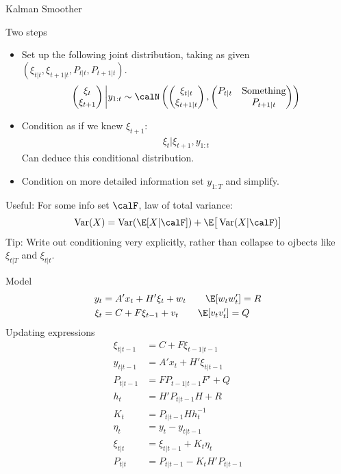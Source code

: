 \documentclass[handout]{beamer}
\newcommand{\Var}{\operatorname{Var}}
\begin{document}
\begin{frame}[shrink]{Kalman Smoother}

Two steps
\begin{itemize}
  \item Set up the following joint distribution, taking as given
    $(\xi_{t|t},\xi_{t+1|t},P_{t|t},P_{t+1|t})$.
    \begin{align*}
      \begin{pmatrix}
        \xi_{t} \\
        \xi_{t+1}
      \end{pmatrix}
      \bigg|
      y_{1:t}
      \sim
      \calN\left(
      \begin{pmatrix}
        \xi_{t|t}
        \\
        \xi_{t+1|t}
      \end{pmatrix}
      ,
      \begin{pmatrix}
        P_{t|t} & \text{Something}
        \\
        & P_{t+1|t}
      \end{pmatrix}
      \right)
    \end{align*}
  \item
    Condition as if we knew $\xi_{t+1}$:
    \begin{align*}
      \xi_{t} | \xi_{t+1},y_{1:t}
    \end{align*}
    Can deduce this conditional distribution.

  \item
    Condition on more detailed information set $y_{1:T}$ and simplify.

\end{itemize}
Useful: For some info set $\calF$, law of total variance:
\begin{align*}
  \Var(X)
  =
  \Var(\E[X|\calF])
  +
  \E\big[\Var(X|\calF)\big]
\end{align*}
Tip: Write out conditioning very explicitly, rather than collapse to
ojbects like $\xi_{t|T}$ and $\xi_{t|t}$.
\end{frame}



\begin{frame}[shrink]
Model
\begin{align*}
  y_t &= A'x_t + H'\xi_t + w_t
  \qquad \E[w_tw_t'] = R \\
  \xi_t &= C + F\xi_{t-1} + v_t
  \qquad
  \E[v_tv_t']=Q
\end{align*}
Updating expressions
\begin{align*}
  \xi_{t|t-1}
  &=
  C + F \xi_{t-1|t-1}
  \\
  y_{t|t-1}
  &=
  A'x_t + H'\xi_{t|t-1}
  \\
  P_{t|t-1}
  &=
  FP_{t-1|t-1}F'
  + Q
  \\
  h_t
  &=
  H'P_{t|t-1}H
  + R
  \\
  K_t
  &=
  P_{t|t-1} H h_t^{-1}
  \\
  \eta_t
  &=
  y_t - y_{t|t-1}
  \\
  \xi_{t|t}
  &=
  \xi_{t|t-1}
  +
  K_t\eta_t
  \\
  P_{t|t}
  &=
  P_{t|t-1}
  - K_t H'P_{t|t-1}
\end{align*}
\end{frame}
\end{document}
